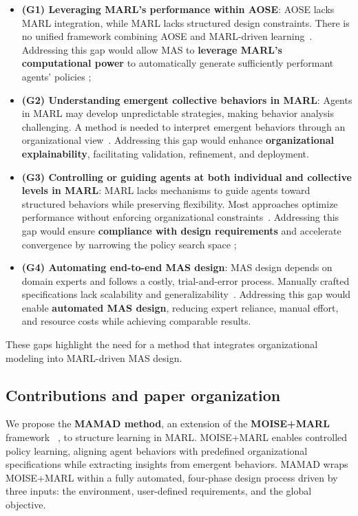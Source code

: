 \documentclass[pdflatex,sn-mathphys-num]{sn-jnl}%
\theoremstyle{thmstyleone}%
\theoremstyle{thmstyletwo}%
\theoremstyle{thmstylethree}%
\begin{document}
\begin{itemize}
    \item \textbf{(G1) Leveraging MARL's performance within AOSE}: AOSE lacks MARL integration, while MARL lacks structured design constraints. There is no unified framework combining AOSE and MARL-driven learning~\cite{Cossentino2014}. Addressing this gap would allow MAS to \textbf{leverage MARL's computational power} to automatically generate sufficiently performant agents' policies ;
          
    \item \textbf{(G2) Understanding emergent collective behaviors in MARL}: Agents in MARL may develop unpredictable strategies, making behavior analysis challenging. A method is needed to interpret emergent behaviors through an organizational view~\cite{Du2022, Papoudakis2021}. Addressing this gap would enhance \textbf{organizational explainability}, facilitating validation, refinement, and deployment.
          
    \item \textbf{(G3) Controlling or guiding agents at both individual and collective levels in MARL}: MARL lacks mechanisms to guide agents toward structured behaviors while preserving flexibility. Most approaches optimize performance without enforcing organizational constraints~\cite{Yuan2023}. Addressing this gap would ensure \textbf{compliance with design requirements} and accelerate convergence by narrowing the policy search space ;
          
    \item \textbf{(G4) Automating end-to-end MAS design}: MAS design depends on domain experts and follows a costly, trial-and-error process. Manually crafted specifications lack scalability and generalizability~\cite{Nguyen2020}. Addressing this gap would enable \textbf{automated MAS design}, reducing expert reliance, manual effort, and resource costs while achieving comparable results.
\end{itemize}
%
These gaps highlight the need for a method that integrates organizational modeling into MARL-driven MAS design.

\subsection{Contributions and paper organization}

We propose the \textbf{MAMAD method}, an extension of the \textbf{MOISE+MARL} framework~\cite{soule2025moisemarl}
, to structure learning in MARL. MOISE+MARL enables controlled policy learning, aligning agent behaviors with predefined organizational specifications while extracting insights from emergent behaviors. MAMAD wraps MOISE+MARL within a fully automated, four-phase design process driven by three inputs: the environment, user-defined requirements, and the global objective.
\end{document}

